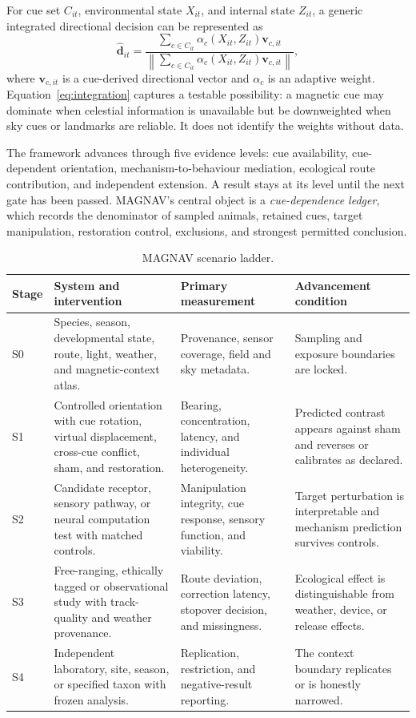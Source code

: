 \documentclass[conference]{IEEEtran}
\begin{document}
For cue set $C_{it}$, environmental state $X_{it}$, and internal state $Z_{it}$, a generic integrated directional decision can be represented as
\begin{equation}
\hat{\mathbf{d}}_{it}=\frac{\sum_{c\in C_{it}}\alpha_c(X_{it},Z_{it})\mathbf{v}_{c,it}}{\left\lVert\sum_{c\in C_{it}}\alpha_c(X_{it},Z_{it})\mathbf{v}_{c,it}\right\rVert},
\label{eq:integration}
\end{equation}
where $\mathbf{v}_{c,it}$ is a cue-derived directional vector and $\alpha_c$ is an adaptive weight. Equation~\eqref{eq:integration} captures a testable possibility: a magnetic cue may dominate when celestial information is unavailable but be downweighted when sky cues or landmarks are reliable. It does not identify the weights without data.

The framework advances through five evidence levels: cue availability, cue-dependent orientation, mechanism-to-behaviour mediation, ecological route contribution, and independent extension. A result stays at its level until the next gate has been passed. MAGNAV's central object is a \emph{cue-dependence ledger}, which records the denominator of sampled animals, retained cues, target manipulation, restoration control, exclusions, and strongest permitted conclusion.

\begin{table}[!t]
\caption{MAGNAV scenario ladder.}\label{tab:ladder}\centering\footnotesize
\begin{tabular}{@{}L{.11\textwidth}L{.25\textwidth}L{.26\textwidth}L{.29\textwidth}@{}}\toprule
Stage & System and intervention & Primary measurement & Advancement condition\\\midrule
S0 & Species, season, developmental state, route, light, weather, and magnetic-context atlas. & Provenance, sensor coverage, field and sky metadata. & Sampling and exposure boundaries are locked.\\
S1 & Controlled orientation with cue rotation, virtual displacement, cross-cue conflict, sham, and restoration. & Bearing, concentration, latency, and individual heterogeneity. & Predicted contrast appears against sham and reverses or calibrates as declared.\\
S2 & Candidate receptor, sensory pathway, or neural computation test with matched controls. & Manipulation integrity, cue response, sensory function, and viability. & Target perturbation is interpretable and mechanism prediction survives controls.\\
S3 & Free-ranging, ethically tagged or observational study with track-quality and weather provenance. & Route deviation, correction latency, stopover decision, and missingness. & Ecological effect is distinguishable from weather, device, or release effects.\\
S4 & Independent laboratory, site, season, or specified taxon with frozen analysis. & Replication, restriction, and negative-result reporting. & The context boundary replicates or is honestly narrowed.\\\bottomrule
\end{tabular}
\end{table}
\end{document}
